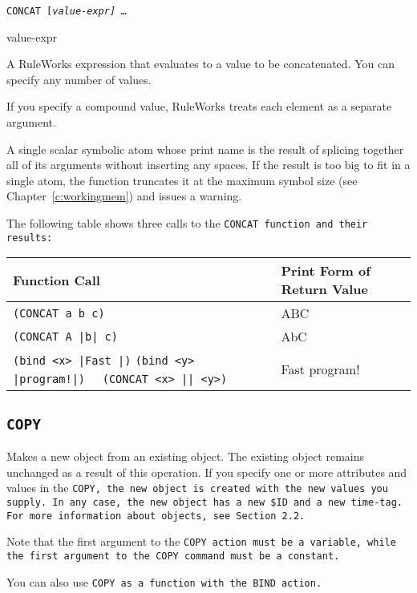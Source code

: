 \Format

\tt{CONCAT} [\it{value-expr}] \ldots

\begin{arguments}
\item[value-expr]

  A RuleWorks expression that evaluates to a value to be
  concatenated. You can specify any number of values.

  If you specify a compound value, RuleWorks treats each element as a
  separate argument.
\end{arguments}

\ReturnValue

A single scalar symbolic atom whose print name is the result of
splicing together all of its arguments without inserting any
spaces. If the result is too big to fit in a single atom, the function
truncates it at the maximum symbol size (see
Chapter~\ref{c:workingmem}) and issues a warning.

\Example

The following table shows three calls to the \tt{CONCAT} function and
their results:

\begin{tabularx}{\columnwidth}{Xl}
  \toprule
  Function Call & Print Form of Return Value \\
  \midrule
  \verb,(CONCAT a b c), & ABC \\
  \verb,(CONCAT A |b| c), & AbC \\
  \raggedright
  \verb,(bind <x> |Fast |), \verb,(bind <y> |program!|), \verb,  (CONCAT <x> || <y>), &  Fast program! \\
  \bottomrule
\end{tabularx}

\subsection{\tt{COPY}}

Makes a new object from an existing object. The existing object
remains unchanged as a result of this operation. If you specify
one or more attributes and values in the \tt{COPY}, the new object is
created with the new values you supply. In any case, the new
object has a new \verb|$ID| and a new time-tag. For more information
about objects, see Section 2.2.

Note that the first argument to the \tt{COPY} action must be a
variable, while the first argument to the \tt{COPY} command must be a
constant.

You can also use \tt{COPY} as a function with the \tt{BIND} action.

